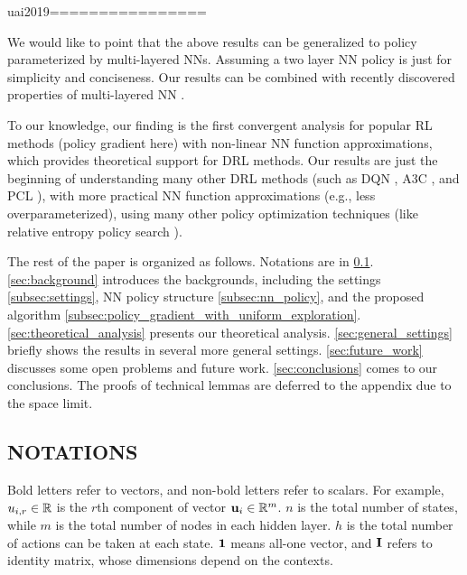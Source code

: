 uai2019================

We would like to point that the above results can be generalized to policy parameterized by multi-layered NNs. Assuming a two layer NN policy is just for simplicity and conciseness. Our results can be combined with recently discovered properties of multi-layered NN   \citep{allen2018convergenceA,allen2018convergenceB,du2018gradientA}.

To our knowledge, our finding is the first convergent analysis for popular RL methods (policy gradient here) with non-linear NN function approximations, which provides theoretical support for DRL methods. Our results are just the beginning of understanding many other DRL methods (such as DQN \cite{mnih2015human}, A3C \citep{mnih2016asynchronous}, and PCL \citep{nachum2017bridging}), with more practical NN function approximations (e.g., less overparameterized), using many other policy optimization techniques (like relative entropy policy search \citep{peters2010relative}).

The rest of the paper is organized as follows. Notations are in \cref{subsec:notations}. \cref{sec:background} introduces the backgrounds, including the settings \cref{subsec:settings}, NN policy structure \cref{subsec:nn_policy}, and the proposed algorithm \cref{subsec:policy_gradient_with_uniform_exploration}. \cref{sec:theoretical_analysis} presents our theoretical analysis. \cref{sec:general_settings} briefly shows the results in several more general settings. \cref{sec:future_work} discusses some open problems and future work. \cref{sec:conclusions} comes to our conclusions. The proofs of technical lemmas are deferred to the appendix due to the space limit.

\subsection{NOTATIONS}
\label{subsec:notations}

Bold letters refer to vectors, and non-bold letters refer to scalars. For example, $u_{i,r} \in {\mathbb{R}}$ is the $r$th component of vector ${\mathbf{u}}_i \in {\mathbb{R}}^m$. $n$ is the total number of states, while $m$ is the total number of nodes in each hidden layer. $h$ is the total number of actions can be taken at each state. ${\mathbf{1}}$ means all-one vector, and ${\mathbf{I}}$ refers to identity matrix, whose dimensions depend on the contexts.

